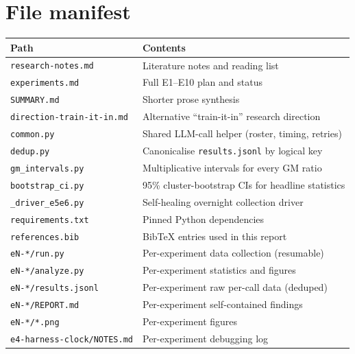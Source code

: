 \documentclass[11pt]{article}
\newcommand{\code}[1]{\texttt{\small #1}}
\begin{document}
\appendix

\section{File manifest}
\label{app:manifest}
\begin{longtable}{@{}ll@{}}
\toprule
Path & Contents \\
\midrule
\endhead
\code{research-notes.md}        & Literature notes and reading list \\
\code{experiments.md}           & Full E1--E10 plan and status \\
\code{SUMMARY.md}               & Shorter prose synthesis \\
\code{direction-train-it-in.md} & Alternative ``train-it-in'' research direction \\
\code{common.py}                & Shared LLM-call helper (roster, timing, retries) \\
\code{dedup.py}                 & Canonicalise \code{results.jsonl} by logical key \\
\code{gm\_intervals.py}         & Multiplicative intervals for every GM ratio \\
\code{bootstrap\_ci.py}         & 95\% cluster-bootstrap CIs for headline statistics \\
\code{\_driver\_e5e6.py}        & Self-healing overnight collection driver \\
\code{requirements.txt}         & Pinned Python dependencies \\
\code{references.bib}           & BibTeX entries used in this report \\
\code{eN-*/run.py}              & Per-experiment data collection (resumable) \\
\code{eN-*/analyze.py}          & Per-experiment statistics and figures \\
\code{eN-*/results.jsonl}       & Per-experiment raw per-call data (deduped) \\
\code{eN-*/REPORT.md}           & Per-experiment self-contained findings \\
\code{eN-*/*.png}               & Per-experiment figures \\
\code{e4-harness-clock/NOTES.md}& Per-experiment debugging log \\
\bottomrule
\end{longtable}
\end{document}
